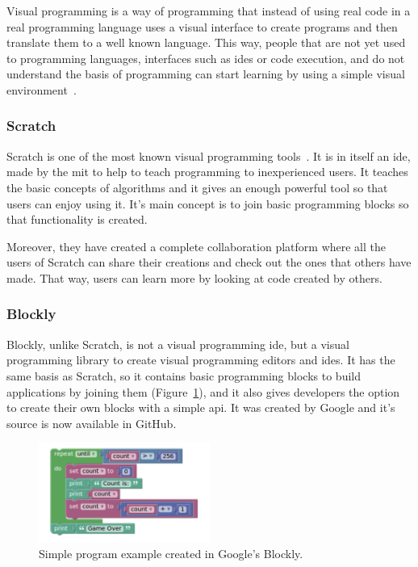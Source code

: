 Visual programming is a way of programming that instead of using real code in a real programming
language uses a visual interface to create programs and then translate them to a well known
language. This way, people that are not yet used to programming languages, interfaces such as
\acrshort{ide}s or code execution, and do not understand the basis of programming can start learning
by using a simple visual environment~\cite{visual_programming}.

\subsubsection{Scratch}

Scratch is one of the most known visual programming tools~\cite{scratch}. It is in itself an
\acrshort{ide}, made by the \acrshort{mit} to help to teach programming to inexperienced users. It
teaches the basic concepts of algorithms and it gives an enough powerful tool so that users can
enjoy using it. It's main concept is to join basic programming blocks so that functionality is
created.

Moreover, they have created a complete collaboration platform where all the users of Scratch can
share their creations and check out the ones that others have made. That way, users can learn more
by looking at code created by others.

\subsubsection{Blockly}

Blockly, unlike Scratch, is not a visual programming \acrshort{ide}, but a visual programming
library to create visual programming editors and \acrshort{ide}s. It has the same basis as Scratch,
so it contains basic programming blocks to build applications by joining them
(Figure~\ref{fig:blockly}), and it also gives developers the option to create their own blocks with
a simple \acrshort{api}. It was created by Google and it's source is now available in GitHub.

\begin{figure}[!htbp]
	\centering
	\includegraphics[width=0.5\textwidth]{fig/blockly}
	\caption{Simple program example created in Google's Blockly.}\label{fig:blockly}
\end{figure}

